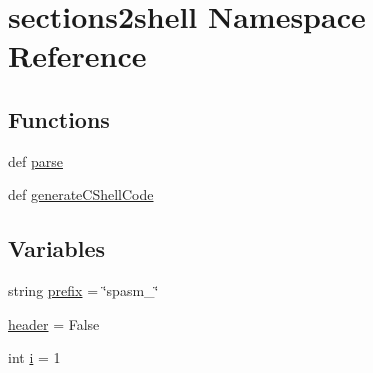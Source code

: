\hypertarget{namespacesections2shell}{
\section{sections2shell \-Namespace \-Reference}
\label{namespacesections2shell}
}
\subsection*{\-Functions}
\begin{DoxyCompactItemize}
\item 
def \hyperlink{namespacesections2shell_a55ad67d362ad87b5cb84736ba2183c6a}{parse}
\item 
def \hyperlink{namespacesections2shell_a5b9effa49a4189bec2fc647ef489c1c8}{generate\-C\-Shell\-Code}
\end{DoxyCompactItemize}
\subsection*{\-Variables}
\begin{DoxyCompactItemize}
\item 
string \hyperlink{namespacesections2shell_a61765c6e86e717fdfa778f3533b3b621}{prefix} = \char`\"{}spasm\-\_\-\char`\"{}
\item 
\hyperlink{namespacesections2shell_a3667169ba9afc983db41b0b9aea336cb}{header} = \-False
\item 
int \hyperlink{namespacesections2shell_a4e78c48a579d23a2c6de71ac9359a9b9}{i} = 1
\end{DoxyCompactItemize}


